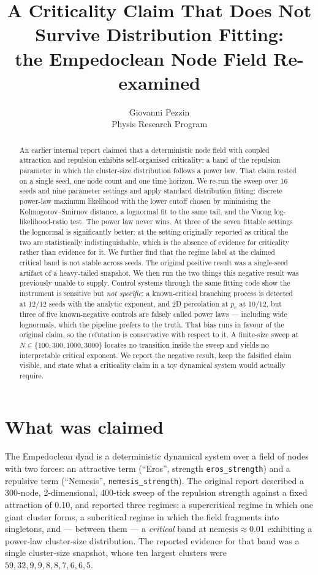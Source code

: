\documentclass[11pt]{article}
\title{A Criticality Claim That Does Not Survive Distribution Fitting:\\
the Empedoclean Node Field Re-examined}
\author{Giovanni Pezzin \\ Physis Research Program}
\date{}
\begin{document}
\maketitle

\begin{abstract}
An earlier internal report claimed that a deterministic node field with
coupled attraction and repulsion exhibits self-organised criticality: a
band of the repulsion parameter in which the cluster-size distribution
follows a power law. That claim rested on a single seed, one node count and
one time horizon. We re-run the sweep over 16 seeds and nine parameter
settings and apply standard distribution fitting: discrete power-law
maximum likelihood with the lower cutoff chosen by minimising the
Kolmogorov--Smirnov distance, a lognormal fit to the same tail, and the
Vuong log-likelihood-ratio test. The power law never wins. At three of the
seven fittable settings the lognormal is significantly better; at the
setting originally reported as critical the two are statistically
indistinguishable, which is the absence of evidence for criticality rather
than evidence for it. We further find that the regime label at the claimed
critical band is not stable across seeds. The original positive result was
a single-seed artifact of a heavy-tailed snapshot. We then run the two
things this negative result was previously unable to supply. Control
systems through the same fitting code show the instrument is sensitive but
\emph{not specific}: a known-critical branching process is detected at
12/12 seeds with the analytic exponent, and 2D percolation at $p_c$ at
10/12, but three of five known-negative controls are falsely called power
laws --- including wide lognormals, which the pipeline prefers to the
truth. That bias runs in favour of the original claim, so the refutation
is conservative with respect to it. A finite-size sweep at
$N \in \{100, 300, 1000, 3000\}$ locates no transition inside the sweep
and yields no interpretable critical exponent. We report the negative
result, keep the falsified claim visible, and state what a criticality
claim in a toy dynamical system would actually require.
\end{abstract}

\section{What was claimed}

The Empedoclean dyad is a deterministic dynamical system over a field of
nodes with two forces: an attractive term (``Eros'', strength
\texttt{eros\_strength}) and a repulsive term (``Nemesis'',
\texttt{nemesis\_strength}). The original report described a 300-node,
2-dimensional, 400-tick sweep of the repulsion strength against a fixed
attraction of 0.10, and reported three regimes: a supercritical regime in
which one giant cluster forms, a subcritical regime in which the field
fragments into singletons, and --- between them --- a \emph{critical} band
at $\text{nemesis} \approx 0.01$ exhibiting a power-law cluster-size
distribution. The reported evidence for that band was a single
cluster-size snapshot, whose ten largest clusters were
$59, 32, 9, 9, 8, 8, 7, 6, 6, 5$.
\end{document}

